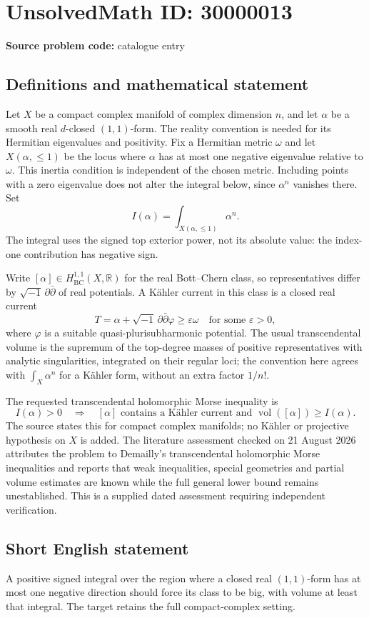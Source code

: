 \documentclass[11pt]{article}
\newcommand{\R}{\mathbb{R}}
\begin{document}
\section*{UnsolvedMath ID: 30000013}
\textbf{Source problem code:} catalogue entry
\subsection{Definitions and mathematical statement}
Let $X$ be a compact complex manifold of complex dimension $n$, and let $\alpha$ be a smooth real $d$-closed $(1,1)$-form. The reality convention is needed for its Hermitian eigenvalues and positivity. Fix a Hermitian metric $\omega$ and let $X(\alpha,\le1)$ be the locus where $\alpha$ has at most one negative eigenvalue relative to $\omega$. This inertia condition is independent of the chosen metric. Including points with a zero eigenvalue does not alter the integral below, since $\alpha^n$ vanishes there. Set
\[
 I(\alpha)=\int_{X(\alpha,\le1)}\alpha^n.
\]
The integral uses the signed top exterior power, not its absolute value: the index-one contribution has negative sign.

Write $[\alpha]\in H^{1,1}_{\mathrm{BC}}(X,\R)$ for the real Bott--Chern class, so representatives differ by $\sqrt{-1}\,\partial\bar\partial$ of real potentials. A K\"ahler current in this class is a closed real current
\[
 T=\alpha+\sqrt{-1}\,\partial\bar\partial\varphi\ge\varepsilon\omega
 \quad\text{for some }\varepsilon>0,
\]
where $\varphi$ is a suitable quasi-plurisubharmonic potential. The usual transcendental volume is the supremum of the top-degree masses of positive representatives with analytic singularities, integrated on their regular loci; the convention here agrees with $\int_X\alpha^n$ for a K\"ahler form, without an extra factor $1/n!$.

The requested transcendental holomorphic Morse inequality is
\[
 I(\alpha)>0\quad\Longrightarrow\quad
 [\alpha]\text{ contains a K\"ahler current and }
 \operatorname{vol}([\alpha])\ge I(\alpha).
\]
The source states this for compact complex manifolds; no K\"ahler or projective hypothesis on $X$ is added. The literature assessment checked on 21 August 2026 attributes the problem to Demailly's transcendental holomorphic Morse inequalities and reports that weak inequalities, special geometries and partial volume estimates are known while the full general lower bound remains unestablished. This is a supplied dated assessment requiring independent verification.
\subsection{Short English statement}
A positive signed integral over the region where a closed real $(1,1)$-form has at most one negative direction should force its class to be big, with volume at least that integral. The target retains the full compact-complex setting.
\end{document}
